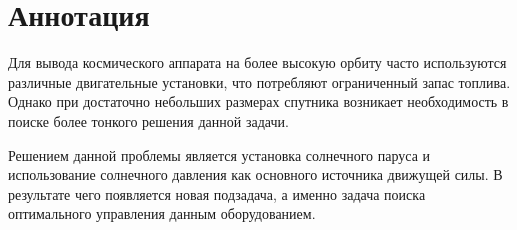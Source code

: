 \chapter{Аннотация}
\noindent\indent Для вывода космического аппарата на более высокую орбиту
часто используются различные двигательные установки, что потребляют ограниченный
запас топлива. Однако при достаточно небольших размерах спутника возникает необходимость
в поиске более тонкого решения данной задачи.\par
Решением данной проблемы является установка солнечного паруса и использование
солнечного давления как основного источника движущей силы. В результате чего
появляется новая подзадача, а именно задача поиска оптимального управления данным
оборудованием.
